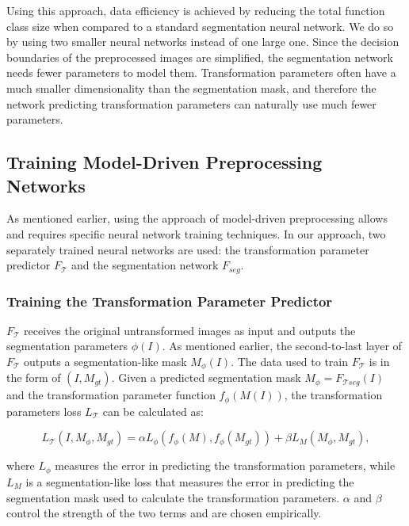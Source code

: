 Using this approach, data efficiency is achieved by reducing the total function class size when compared to a standard segmentation neural network. We do so by using two smaller neural networks instead of one large one. Since the decision boundaries of the preprocessed images are simplified, the segmentation network needs fewer parameters to model them. Transformation parameters often have a much smaller dimensionality than the segmentation mask, and therefore the network predicting transformation parameters can naturally use much fewer parameters.

\subsection{Training Model-Driven Preprocessing Networks}

As mentioned earlier, using the approach of model-driven preprocessing allows and requires specific neural network training techniques. In our approach, two separately trained neural networks are used: the transformation parameter predictor $F_{\mathcal{T}}$ and the segmentation network $F_{seg}$. 

\subsubsection{Training the Transformation Parameter Predictor}

$F_{\mathcal{T}}$ receives the original untransformed images as input and outputs the segmentation parameters $\phi(I)$. As mentioned earlier, the second-to-last layer of $F_{\mathcal{T}}$ outputs a segmentation-like mask $M_\phi(I)$. The data used to train $F_{\mathcal{T}}$ is in the form of $(I, M_{gt})$. Given a predicted segmentation mask $M_\phi = F_{\mathcal{T}seg}(I)$ and the transformation parameter function $f_\phi(M(I))$, the transformation parameters loss $L_\mathcal{T}$ can be calculated as:

\begin{equation}
	L_\mathcal{T}(I, M_\phi, M_{gt}) = \alpha L_\phi(f_\phi(M), f_\phi(M_{gt})) + \beta L_{M}(M_\phi, M_{gt}),
\end{equation}

where $L_\phi$ measures the error in predicting the transformation parameters, while $L_{M}$ is a segmentation-like loss that measures the error in predicting the segmentation mask used to calculate the transformation parameters. $\alpha$ and $\beta$ control the strength of the two terms and are chosen empirically.

